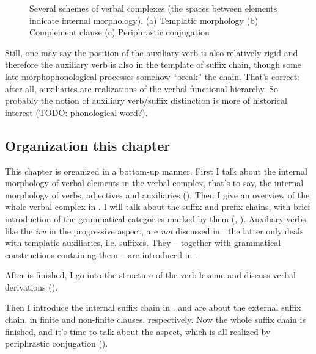\documentclass[UTF8, a4paper, oneside, scheme=plain]{ctexrep}
\newcommand{\corpus}[1]{\emph{#1}}
\begin{document}
\begin{figure}[H]
    \centering
    
    \caption{Several schemes of verbal complexes (the spaces between elements indicate internal morphology). 
    (a) Templatic morphology (b) Complement clause (c) Periphrastic conjugation}
    \label{fig:verb-complex-scheme}
\end{figure}

Still, one may say the position of the auxiliary verb is also relatively rigid 
and therefore the auxiliary verb is also in the template of suffix chain,
though some late morphophonological processes somehow ``break'' the chain.
That's correct: after all, auxiliaries are realizations of the verbal functional hierarchy.
So probably the notion of auxiliary verb/suffix distinction is more of historical interest
(TODO: phonological word?).

\subsection{Organization this chapter}

This chapter is organized in a bottom-up manner.
First I talk about the internal morphology of verbal elements in the verbal complex,
that's to say, the internal morphology of verbs, adjectives and auxiliaries 
().
Then I give an overview of the whole verbal complex in . 
I will talk about the suffix and prefix chains,
with brief introduction of the grammatical categories marked by them
(, ).
Auxiliary verbs, like the \corpus{iru} in the progressive aspect,
are \emph{not} discussed in :
the latter only deals with templatic auxiliaries, i.e. suffixes.
They -- together with grammatical constructions containing them -- 
are introduced in .

After  is finished,
I go into the structure of the verb lexeme and discuss verbal derivations ().

Then I introduce the internal suffix chain in .
 and  
are about the external suffix chain,
in finite and non-finite clauses, respectively.
Now the whole suffix chain is finished, and it's time to talk about the aspect,
which is all realized by periphrastic conjugation ().
\end{document}
